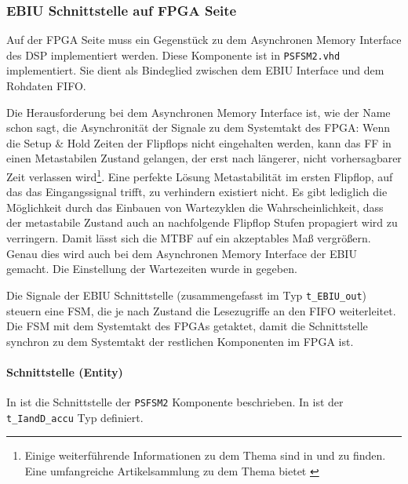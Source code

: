 \subsubsection{EBIU Schnittstelle auf FPGA Seite}


Auf der FPGA Seite muss ein Gegenstück zu dem Asynchronen Memory Interface des DSP implementiert werden. Diese Komponente ist in \lstinline$PSFSM2.vhd$ implementiert. Sie dient als Bindeglied zwischen dem EBIU Interface und dem Rohdaten FIFO.

Die Herausforderung bei dem Asynchronen Memory Interface ist, wie der Name schon sagt, die Asynchronität der Signale zu dem Systemtakt des FPGA: Wenn die Setup \& Hold Zeiten der Flipflops nicht eingehalten werden, kann das FF in einen Metastabilen Zustand gelangen, der erst nach längerer, nicht vorhersagbarer Zeit verlassen wird\footnote{Einige weiterführende Informationen zu dem Thema sind in \cite{FPGAFAQMetastability} und \cite{ginosar2011metastability} zu finden. Eine umfangreiche Artikelsammlung zu dem Thema bietet \cite{MetastabilityBibliography}}. 
Eine perfekte Lösung Metastabilität im ersten Flipflop, auf das das Eingangssignal trifft, zu verhindern existiert nicht. Es gibt lediglich die Möglichkeit durch das Einbauen von Wartezyklen die Wahrscheinlichkeit, dass der metastabile Zustand auch an nachfolgende Flipflop Stufen propagiert wird zu verringern. Damit lässt sich die \gls{MTBF} auf ein akzeptables Maß vergrößern. Genau dies wird auch bei dem Asynchronen Memory Interface der EBIU gemacht. Die Einstellung der Wartezeiten wurde in  gegeben.

Die Signale der EBIU Schnittstelle (zusammengefasst im Typ \lstinline$t_EBIU_out$) steuern eine \gls{FSM}, die je nach Zustand die Lesezugriffe an den FIFO weiterleitet. Die \gls{FSM} mit dem Systemtakt des FPGAs getaktet, damit die Schnittstelle synchron zu dem Systemtakt der restlichen Komponenten im FPGA ist.

\paragraph{Schnittstelle (Entity)}
In  ist die Schnittstelle der \lstinline$PSFSM2$ Komponente beschrieben. In  ist der \lstinline$t_IandD_accu$ Typ definiert.

